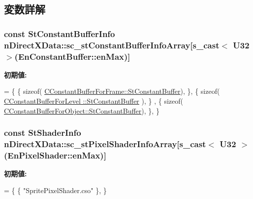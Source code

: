 \subsection{変数詳解}
\hypertarget{namespacen_direct_x_data_aee31e6ee976d87b70c57004759800439}{}
\subsubsection[{sc\+\_\+st\+Constant\+Buffer\+Info\+Array}]{\setlength{\rightskip}{0pt plus 5cm}const {\bf St\+Constant\+Buffer\+Info} n\+Direct\+X\+Data\+::sc\+\_\+st\+Constant\+Buffer\+Info\+Array\mbox{[}{\bf s\+\_\+cast}$<$ U32 $>$({\bf En\+Constant\+Buffer\+::en\+Max})\mbox{]}}\label{namespacen_direct_x_data_aee31e6ee976d87b70c57004759800439}
{\bfseries 初期値\+:}
\begin{DoxyCode}
=
    \{
        \{ \textcolor{keyword}{sizeof}( \hyperlink{struct_c_constant_buffer_for_frame_1_1_st_constant_buffer}{CConstantBufferForFrame::StConstantBuffer}), \},
        \{ \textcolor{keyword}{sizeof}( \hyperlink{struct_c_constant_buffer_for_level_1_1_st_constant_buffer}{CConstantBufferForLevel ::StConstantBuffer} ), \}
      ,
        \{ \textcolor{keyword}{sizeof}( \hyperlink{struct_c_constant_buffer_for_object_1_1_st_constant_buffer}{CConstantBufferForObject::StConstantBuffer}), \},
    \}
\end{DoxyCode}
\hypertarget{namespacen_direct_x_data_aa823f5457cf0ccff5042787b83150597}{}
\subsubsection[{sc\+\_\+st\+Pixel\+Shader\+Info\+Array}]{\setlength{\rightskip}{0pt plus 5cm}const {\bf St\+Shader\+Info} n\+Direct\+X\+Data\+::sc\+\_\+st\+Pixel\+Shader\+Info\+Array\mbox{[}{\bf s\+\_\+cast}$<$ U32 $>$({\bf En\+Pixel\+Shader\+::en\+Max})\mbox{]}}\label{namespacen_direct_x_data_aa823f5457cf0ccff5042787b83150597}
{\bfseries 初期値\+:}
\begin{DoxyCode}
=
    \{
        \{ \textcolor{stringliteral}{"SpritePixelShader.cso"} \},
    \}
\end{DoxyCode}


